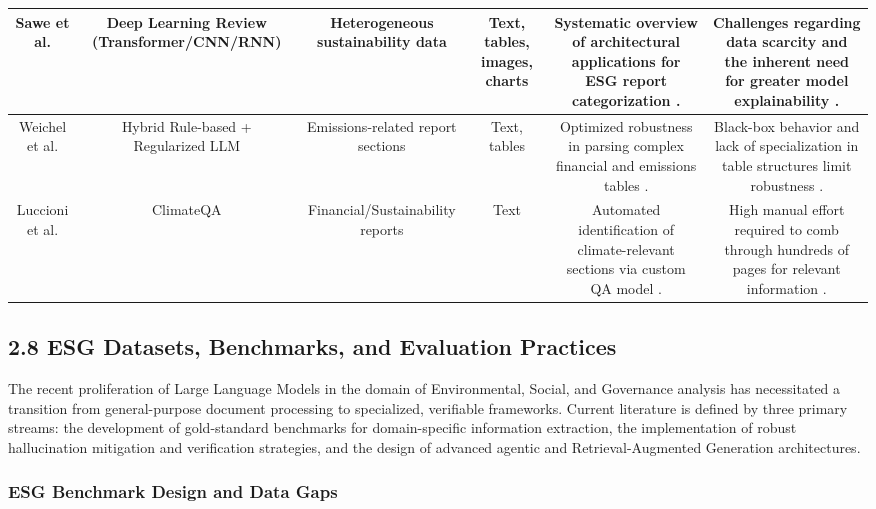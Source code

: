 \documentclass{article}
\begin{document}
\begin{table}[h!]
\begin{tabular}{|c|c|c|c|c|c|}
Sawe et al.  \parencite{sarah_chepkogei_sawe_a4abd9c5} & Deep Learning Review (Transformer/CNN/RNN) & Heterogeneous sustainability data & Text, tables, images, charts & Systematic overview of architectural applications for ESG report categorization  \parencite{sarah_chepkogei_sawe_a4abd9c5}. & Challenges regarding data scarcity and the inherent need for greater model explainability  \parencite{sarah_chepkogei_sawe_a4abd9c5}. \\ \hline
Weichel et al.  \parencite{hendrik_weichel_5ea70935} & Hybrid Rule-based + Regularized LLM & Emissions-related report sections & Text, tables & Optimized robustness in parsing complex financial and emissions tables  \parencite{hendrik_weichel_5ea70935}. & Black-box behavior and lack of specialization in table structures limit robustness  \parencite{hendrik_weichel_5ea70935}. \\ \hline
Luccioni et al.  \parencite{alexandra_sasha_luccioni_f5a602b0} & ClimateQA & Financial/Sustainability reports & Text & Automated identification of climate-relevant sections via custom QA model  \parencite{alexandra_sasha_luccioni_f5a602b0}. & High manual effort required to comb through hundreds of pages for relevant information  \parencite{alexandra_sasha_luccioni_f5a602b0}. \\ \hline
\end{tabular}
\end{table}
\subsection{2.8 ESG Datasets, Benchmarks, and Evaluation Practices}

The recent proliferation of Large Language Models in the domain of Environmental, Social, and Governance analysis has necessitated a transition from general-purpose document processing to specialized, verifiable frameworks. Current literature is defined by three primary streams: the development of gold-standard benchmarks for domain-specific information extraction, the implementation of robust hallucination mitigation and verification strategies, and the design of advanced agentic and Retrieval-Augmented Generation architectures.
\subsubsection{ESG Benchmark Design and Data Gaps}
\end{document}
